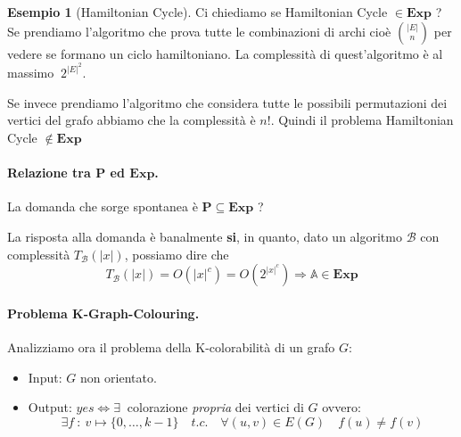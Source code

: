 \documentclass[a4paper]{article}
\theoremstyle{definition}
\newtheorem{esempio}{Esempio}[subsection]
\newcommand{\Exp}{\mathbf{Exp}}
\newcommand{\p}{\mathbf{P}}
\newcommand{\prob}[1]{\mathbb{#1}}
\newcommand{\alg}[1]{\mathcal{#1}}
\newcommand{\compl}[2]{T_\alg{#1}( \vert #2 \vert)}
\begin{document}
			\begin{esempio}[Hamiltonian Cycle]
				Ci chiediamo se Hamiltonian Cycle $ \in \Exp$ ? Se prendiamo l'algoritmo che prova tutte le combinazioni di archi cioè $ \binom{\vert E \vert}{n} $ per vedere se formano un ciclo hamiltoniano. La complessità di quest'algoritmo è al massimo $\ 2^{\vert E \vert^2} $. 
				
				Se invece prendiamo l'algoritmo che considera tutte le possibili permutazioni dei vertici del grafo abbiamo che la complessità è $ n! $. Quindi il problema Hamiltonian Cycle $ \notin \Exp $
			\end{esempio}
			
			\paragraph{Relazione tra $ \p $ ed $ \Exp $.} La domanda che sorge spontanea è $ \p \subseteq \Exp $ ?
			
			La risposta alla domanda è banalmente \textbf{si}, in quanto, dato un algoritmo $ \alg{B} $ con complessità $\compl{B}{x}$, possiamo dire che 
			\[ 
				\compl{B}{x} = O(\vert x \vert ^ c) = O(2^{\vert x \vert ^ c}) \Rightarrow \prob{A} \in \Exp 
			\]
			
			\paragraph{Problema K-Graph-Colouring.} Analizziamo ora il problema della K-colorabilità di un grafo $ G $:
			\begin{itemize}
				\item Input: $ G $ non orientato.
				\item Output: $ yes \Leftrightarrow \exists\ $ colorazione \textit{propria} dei vertici di $ G $ ovvero:
				\[
					\exists f\ \colon\ v \mapsto \{0,\dots, k-1 \}\quad t.c.\quad \forall (u,v)\in E(G)\quad f(u) \neq f(v)
				\]
			\end{itemize}
			
\end{document}
